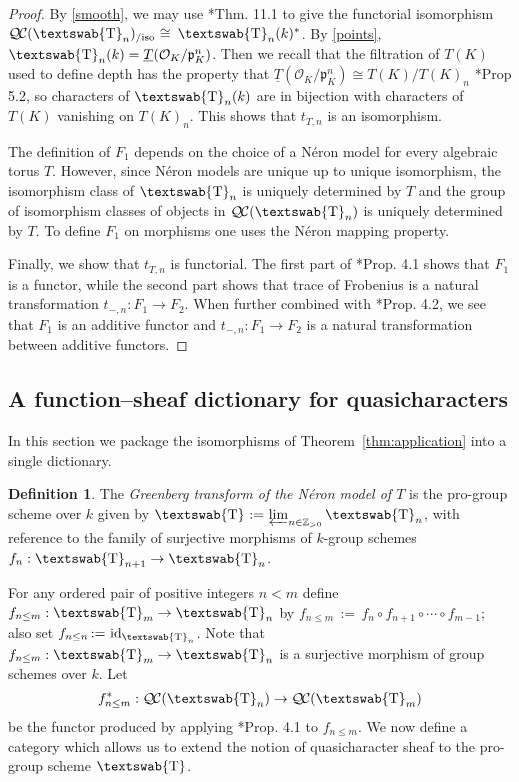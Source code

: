 \documentclass{amsart}
\theoremstyle{plain}
\theoremstyle{definition}
\newtheorem{definition}[theorem]{Definition}
\theoremstyle{remark}
\newcommand{\ZZ}{{\mathbb{Z}}}
\newcommand{\OK}{\mathcal{O}_K}
\newcommand{\pK}{\mathfrak{p}_K}
\newcommand{\Fq}{k}
\newcommand{\mathswab}[1]{\operatorname{\textswab{#1}}}
\newcommand{\GN}[1]{\mathswab{#1}}
\newcommand{\TT}{\underline{T}}
\DeclareMathOperator{\id}{id}
\newcommand{\ceq}{{\, :=\, }}
\newcommand{\iso}{{\ \cong\ }}
\newcommand{\QC}{{\mathcal{Q\hskip-0.8pt C}}}
\newcommand{\QCiso}[1]{\QC(#1)_{/\text{iso}}}
\newcommand{\trFrob}[1]{t_{#1}}
\begin{document}
\begin{proof}
  By \ref{smooth}, we may use \cite{cunningham-roe:dictionary}*{Thm. 11.1}
   to give the functorial isomorphism
  $\QCiso{\GN{T}_n} \iso \GN{T}_n(\Fq)^*$.
  By \ref{points}, $\GN{T}_n(\Fq) = \TT(\OK/\pK^n)$.
  Then we recall that the filtration of $T(K)$ used to
  define depth has the property that $\TT(\OK/\pK^n) \cong T(K) / T(K)_n$
  \cite{yu:03a}*{Prop 5.2}, so characters of $\GN{T}_n(\Fq)$
  are in bijection with characters of $T(K)$ vanishing on $T(K)_n$.
  This shows that $\trFrob{T,n}$ is an isomorphism.

  The definition of $F_1$ depends
  on the choice of a Néron model for every algebraic torus $T$.
  However, since Néron models are unique up to unique isomorphism,
  the isomorphism class of $\GN{T}_n$ is uniquely determined by $T$
  and the group of isomorphism classes of objects in $\QC(\GN{T}_n)$
  is uniquely determined by $T$.
  To define $F_1$ on morphisms one uses the Néron mapping property.

  Finally, we show that $\trFrob{T,n}$ is functorial.
The first part of \cite{cunningham-roe:dictionary}*{Prop. 4.1} shows that $F_1$ is a functor,
while the second part shows that trace of Frobenius is a natural transformation
$t_{ - ,n} : F_1 \to F_2$. When further combined with \cite{cunningham-roe:dictionary}*{Prop. 4.2},
we see that $F_1$ is an additive functor and $t_{ - ,n}: F_1 \to F_2$ is a
natural transformation between additive functors.
\end{proof}


\subsection{A function--sheaf dictionary for quasicharacters} \label{sec:quasichar}

In this section we package the isomorphisms of Theorem~\ref{thm:application} into
a single dictionary.

\begin{definition}\label{def:objGN}
The \emph{Greenberg transform of the N\'eron model of $T$}
is the pro-group scheme over $\Fq$ given by
$\GN{T} \ceq \varprojlim_{n\in \ZZ_{>0}} \GN{T}_{n}$,
with reference to the family of  surjective morphisms of
$\Fq$-group schemes $f_n : \GN{T}_{n+1} \to \GN{T}_n$.
\end{definition}

For any  ordered pair of positive integers $n< m$ define
$f_{n\leq m} : \GN{T}_{m} \to \GN{T}_{n}$
by $f_{n\leq m}\ceq f_n \circ f_{n+1} \circ \cdots \circ f_{m-1}$;
also set $f_{n\leq n} \ceq \id_{\GN{T}_n}$.
Note that $f_{n\leq m}:  \GN{T}_{m} \to \GN{T}_{n}$ is a surjective morphism
of group schemes over $\Fq$.
Let
\[
f_{n\leq m}^* : \QC(\GN{T}_n) \to \QC(\GN{T}_{m})
\]
be the functor produced by applying \cite{cunningham-roe:dictionary}*{Prop. 4.1} to $f_{n\leq m}$.
We now define a category which allows us to extend the notion
of quasicharacter sheaf to the pro-group scheme $\GN{T}$.
\end{document}
